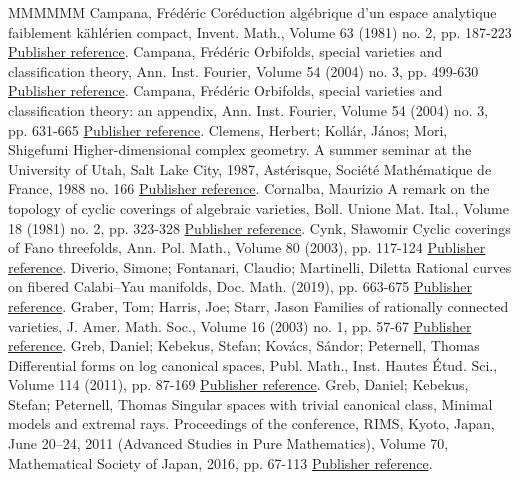 \documentclass[11pt]{article}
\theoremstyle{definition}
\numberwithin{equation}{section}
\numberwithin{figure}{section}
\numberwithin{table}{section}
\begin{document}
\begin{thebibliography}{MMMMMM}
 Campana, Frédéric Coréduction algébrique d’un espace analytique faiblement kählérien compact, Invent. Math., Volume 63 (1981) no. 2, pp. 187-223 \href{https://ahl.centre-mersenne.org/item/AHL_2020__3__473_0/#Ca81}{Publisher reference}.
 Campana, Frédéric Orbifolds, special varieties and classification theory, Ann. Inst. Fourier, Volume 54 (2004) no. 3, pp. 499-630 \href{https://ahl.centre-mersenne.org/item/AHL_2020__3__473_0/#Ca04a}{Publisher reference}.
 Campana, Frédéric Orbifolds, special varieties and classification theory: an appendix, Ann. Inst. Fourier, Volume 54 (2004) no. 3, pp. 631-665 \href{https://ahl.centre-mersenne.org/item/AHL_2020__3__473_0/#Ca04}{Publisher reference}.
 Clemens, Herbert; Kollár, János; Mori, Shigefumi Higher-dimensional complex geometry. A summer seminar at the University of Utah, Salt Lake City, 1987, Astérisque, Société Mathématique de France, 1988 no. 166 \href{https://ahl.centre-mersenne.org/item/AHL_2020__3__473_0/#CKL88}{Publisher reference}.
 Cornalba, Maurizio A remark on the topology of cyclic coverings of algebraic varieties, Boll. Unione Mat. Ital., Volume 18 (1981) no. 2, pp. 323-328 \href{https://ahl.centre-mersenne.org/item/AHL_2020__3__473_0/#Cor81}{Publisher reference}.
 Cynk, Sławomir Cyclic coverings of Fano threefolds, Ann. Pol. Math., Volume 80 (2003), pp. 117-124 \href{https://ahl.centre-mersenne.org/item/AHL_2020__3__473_0/#Cy03}{Publisher reference}.
 Diverio, Simone; Fontanari, Claudio; Martinelli, Diletta Rational curves on fibered Calabi–Yau manifolds, Doc. Math. (2019), pp. 663-675 \href{https://ahl.centre-mersenne.org/item/AHL_2020__3__473_0/#DFM16}{Publisher reference}.
 Graber, Tom; Harris, Joe; Starr, Jason Families of rationally connected varieties, J. Amer. Math. Soc., Volume 16 (2003) no. 1, pp. 57-67 \href{https://ahl.centre-mersenne.org/item/AHL_2020__3__473_0/#GHS03}{Publisher reference}.
 Greb, Daniel; Kebekus, Stefan; Kovács, Sándor; Peternell, Thomas Differential forms on log canonical spaces, Publ. Math., Inst. Hautes Étud. Sci., Volume 114 (2011), pp. 87-169 \href{https://ahl.centre-mersenne.org/item/AHL_2020__3__473_0/#GKKP11}{Publisher reference}.
 Greb, Daniel; Kebekus, Stefan; Peternell, Thomas Singular spaces with trivial canonical class, Minimal models and extremal rays. Proceedings of the conference, RIMS, Kyoto, Japan, June 20–24, 2011 (Advanced Studies in Pure Mathematics), Volume 70, Mathematical Society of Japan, 2016, pp. 67-113 \href{https://ahl.centre-mersenne.org/item/AHL_2020__3__473_0/#GKP16}{Publisher reference}.

\end{thebibliography}
\end{document}
